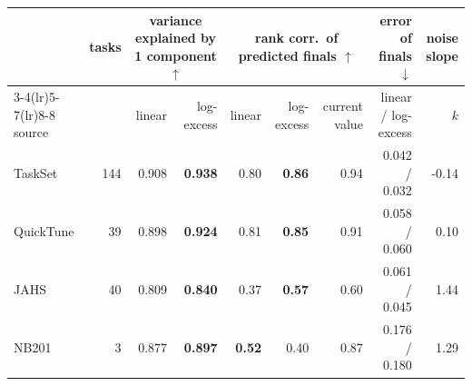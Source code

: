 \begin{tabular}{lrrrrrrrr}
\toprule
 & tasks & \multicolumn{2}{c}{variance explained by 1 component $\uparrow$} & \multicolumn{3}{c}{rank corr.\ of predicted finals $\uparrow$} & error of finals $\downarrow$ & noise slope \\
\cmidrule(lr){3-4}\cmidrule(lr){5-7}\cmidrule(lr){8-8}
source & & linear & log-excess & linear & log-excess & current value & linear / log-excess & $k$ \\
\midrule
TaskSet & 144 & 0.908 & \textbf{0.938} & 0.80 & \textbf{0.86} & 0.94 & 0.042 / 0.032 & -0.14 \\
QuickTune & 39 & 0.898 & \textbf{0.924} & 0.81 & \textbf{0.85} & 0.91 & 0.058 / 0.060 & 0.10 \\
JAHS & 40 & 0.809 & \textbf{0.840} & 0.37 & \textbf{0.57} & 0.60 & 0.061 / 0.045 & 1.44 \\
NB201 & 3 & 0.877 & \textbf{0.897} & \textbf{0.52} & 0.40 & 0.87 & 0.176 / 0.180 & 1.29 \\
\bottomrule
\end{tabular}
